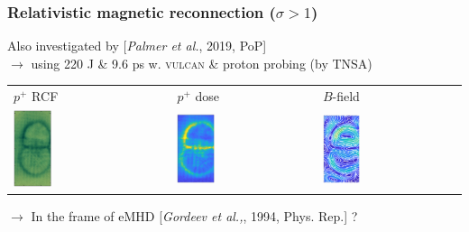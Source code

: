 \documentclass{beamer}
\begin{document}
\begin{frame}
\frametitle{Relativistic magnetic reconnection ($\sigma > 1$)}

Also investigated by [\textit{Palmer et al.}, 2019, PoP] \\
$\to$ using 220 J \& 9.6 ps w. \textsc{vulcan} \& proton probing (by TNSA) \\

\begin{center}
\begin{tabular}{lll}
$p^+$ RCF \hspace{2.0cm} & $p^+$ dose \hspace{2.0cm} & $B$-field \\
\includegraphics[width=0.25\textwidth]{palmer2019_a.png} &
\includegraphics[width=0.28\textwidth]{palmer2019_b.png} &
\includegraphics[width=0.28\textwidth]{palmer2019_c.png} \\
\end{tabular}
\end{center}

$\to$ In the frame of eMHD [\textit{Gordeev et al.,}, 1994, Phys. Rep.] ?

\end{frame}
\end{document}
